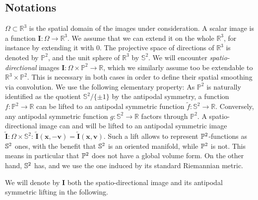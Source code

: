 \documentclass[twocolumn]{svjour3}
\begin{document}
\subsection{Notations}
$\Omega\subset \mathbb R^3$ is the
spatial domain of the images under consideration. A scalar image is a function
$\bm I:\Omega\to\mathbb R^3$. We assume that we can extend it on the whole $\mathbb R^3$,
for instance by extending it with 0. The projective space of directions of $\mathbb R^3$
is denoted by $\mathbb P^2$, and the unit sphere of $\mathbb R^3$ by $\mathbb S^2$.  We
will encounter \emph{spatio-directional} images
$\bm I:\Omega\times \mathbb P^2 \to \mathbb R$, which we similarly assume too be
extendable to $\mathbb R^3\times \mathbb P^2$. This is necessary in both cases in order to
define their spatial smoothing via convolution. We use the following elementary property:
As $\mathbb P^2$ is naturally identified as the quotient $\mathbb S^2/\{\pm 1\}$ by
the antipodal symmetry, a function $f:\mathbb P^2\to \mathbb R$ can be lifted to an
antipodal symmetric function $\tilde{f}:\mathbb{S}^2\to \mathbb{R}$. Conversely, any
antipodal symmetric function $g:\mathbb S^2\to \mathbb R$ factors through $\mathbb P^2$.
A spatio-directional image can and will be lifted to an antipodal symmetric image
$\tilde{\bm I}:\Omega\times \mathbb S^2$:
$\tilde{\bm I}(\bm x, -\bm v) =\tilde{\bm I}(\bm x, \bm v)$.  Such a lift allows to represent ${\mathbb P}^2$-functions as ${\mathbb S}^2$ ones, 
with the benefit that ${\mathbb S}^2$ is an oriented manifold, while ${\mathbb P}^2$ is not. This means in particular that ${\mathbb P}^2$ does not have a global volume form.
On the other hand, ${\mathbb S}^2$ has, and we use the one induced by its standard Riemannian metric.

We will denote by $\bm I$
both the spatio-directional image and its antipodal symmetric lifting in the following.
\end{document}
